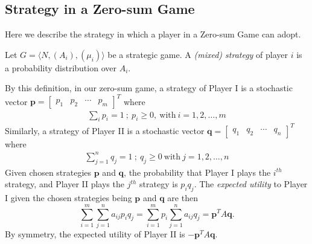 \documentclass[11pt,reqno, a4]{amsart}
\begin{document}
\subsection{Strategy in a Zero-sum Game}
    Here we describe the strategy in which a player in a Zero-sum Game can adopt.
    \begin{definition}
        Let $G = \langle N, (A_i), (\mu_i) \rangle$ be a strategic game. A \textit{(mixed) strategy} of player $i$ is a probability distribution over $A_i$.
    \end{definition}
\noindent By this definition, in our zero-sum game, a strategy of Player I is a stochastic vector $\bm{p} = \begin{bmatrix}
        p_1 & p_2 & \cdots & p_m
    \end{bmatrix}^T$ where 
    \begin{align*}
        \sum_{i } p_i = 1 \ ; \
        p_i  \geq 0, \ \text{with} \ i = 1, 2, \dots, m
    \end{align*}
    Similarly, a strategy of Player II is a stochastic vector $\bm{q} = \begin{bmatrix}
        q_1 & q_2 & \cdots & q_n
    \end{bmatrix}^T$ where 
    \begin{align*}
        \sum_{j = 1}^n q_j = 1 \ ; \
        q_j \geq 0 \ \text{with} \ j = 1, 2, \dots, n
    \end{align*}
    Given chosen strategies $\bm{p}$ and $\bm{q}$, the probability that Player I plays the $i^{th}$ strategy, and Player II plays the $j^{th}$ strategy is $p_iq_j$. The \textit{expected utility} to Player I given the chosen strategies being $\bm{p}$ and $\bm{q}$ are then
    \[
    \sum_{i = 1}^m \sum_{j=1}^n a_{ij}p_iq_j = \sum_{i=1}^m p_i \sum_{j=1}^n a_{ij}q_j = \bm{p}^T A\bm{q}.
    \]
    By symmetry, the expected utility of Player II is $-\bm{p}^T A\bm{q}$.
\end{document}
